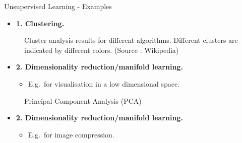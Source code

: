 \begin{vbframe}{Unsupervised Learning - Examples}
  \begin{itemize}
    \item[] \textbf{1. Clustering.}
  \end{itemize}
  \begin{figure}
    \centering
    \caption{\footnotesize{Cluster analysis results  for different algorithms. Different clusters are indicated by different colors. (Source : Wikipedia)}}
  \end{figure}
\framebreak
  \begin{itemize}
    \item[] \textbf{2. Dimensionality reduction/manifold learning.}
    \ \begin{itemize}
    \item E.g.~for  visualisation in a low dimensional space.
    \end{itemize}
  \end{itemize}

    \begin{figure}
        \caption{\footnotesize{Principal Component Analysis (PCA)}}
    \end{figure}

\framebreak
  \begin{itemize}
    \item[] \textbf{2. Dimensionality reduction/manifold learning.}
    \ \begin{itemize}
    \item E.g.~for  image compression.
    \end{itemize}
  \end{itemize}


\end{vbframe}
